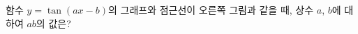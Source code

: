 \noindent\begin{minipage}[t]{0.58\linewidth}\vspace{0pt}\raggedright 함수 $y=\tan (ax-b)$의 그래프와 점근선이 오른쪽 그림과 같을 때, 상수 $a$, $b$에 대하여 $ab$의 값은? \end{minipage}\hfill\begin{minipage}[t]{0.4\linewidth}\vspace{0pt}\centering \resizebox{\ifdim\width>\linewidth\linewidth\else\width\fi}{!}{}\end{minipage}\par
{}
